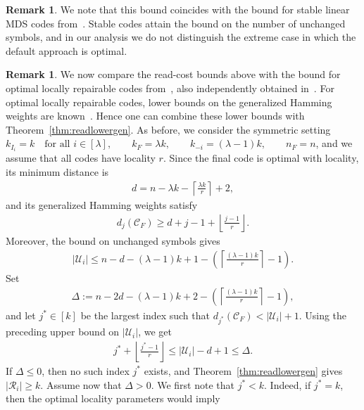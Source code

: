 \documentclass[conference, 10pt]{IEEEtran}
\theoremstyle{plain}
\theoremstyle{definition}
\newtheorem{remark}[definition]{Remark}
\newcommand{\mC}{\mathcal{C}}
\newcommand{\mU}{\mathcal{U}}
\newcommand{\mR}{\mathcal{R}}
\begin{document}
\begin{remark}\label{remark:bound-MDS}
We note that this bound coincides with the bound for stable linear MDS codes from~\cite{maturana2022convertible}. Stable codes attain the bound on the number of unchanged symbols, and in our analysis we do not distinguish the extreme case in which the default approach is optimal. 
\end{remark}

\begin{remark}\label{remark:readcost-LRC}
We now compare the read-cost bounds above with the bound for optimal locally repairable codes from~\cite{ge2025locally}, also independently obtained in~\cite{shi2025bounds}. For optimal locally repairable codes, lower bounds on the generalized Hamming weights are known~\cite{hao2020generalized}. Hence one can combine these lower bounds with Theorem~\ref{thm:readlowergen}. As before, we consider the symmetric setting
$k_{I_i}=k \quad \text{for all } i\in[\lambda], \qquad
    k_F=\lambda k, \qquad
    k_{-i}=(\lambda-1)k, \qquad
    n_F=n$, and we assume that all codes have locality $r$. Since the final code is optimal with locality, its minimum distance is
\begin{align*}
    d=n-\lambda k-\left\lceil \frac{\lambda k}{r}\right\rceil+2,
\end{align*}
and its generalized Hamming weights satisfy
\begin{align*}
    d_j(\mC_F)\ge d+j-1+\left\lfloor \frac{j-1}{r}\right\rfloor .
\end{align*}
Moreover, the bound on unchanged symbols gives
\begin{align*}
    |\mU_i|\le n-d-(\lambda-1)k+1
    -\left(\left\lceil\frac{(\lambda-1)k}{r}\right\rceil-1\right).
\end{align*}
Set
\begin{align*}
    \Delta
    :=n-2d-(\lambda-1)k+2
    -\left(\left\lceil\frac{(\lambda-1)k}{r}\right\rceil-1\right),
\end{align*}
and let $j^*\in[k]$ be the largest index such that $d_{j^*}(\mC_F)<|\mU_i|+1.$
Using the preceding upper bound on $|\mU_i|$, we get
\begin{align*}
    j^*+\left\lfloor\frac{j^*-1}{r}\right\rfloor
    \le |\mU_i|-d+1
    \le \Delta .
\end{align*}
If $\Delta\le 0$, then no such index $j^*$ exists, and Theorem~\ref{thm:readlowergen} gives $|\mR_i|\ge k.$
Assume now that $\Delta>0$. We first note that $j^*<k$. Indeed, if $j^*=k$, then the optimal locality parameters would imply

\end{remark}
\end{document}
